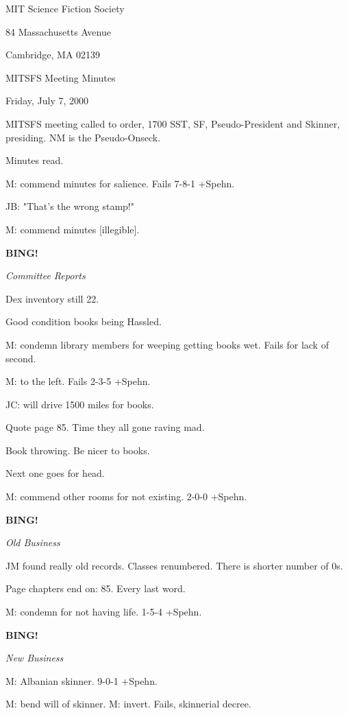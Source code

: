 \documentclass[12pt]{article}
\newcommand{\bing}{{\bf BING!} }
\newcommand{\goto}[1]{\bing \vskip 12pt \centerline{{\em{#1}}}}
\begin{document}
\begin{center}

MIT Science Fiction Society 

84 Massachusetts Avenue

Cambridge, MA 02139

\vspace{12pt}

MITSFS Meeting Minutes 

Friday, July 7, 2000

\end{center}
 
\vspace{18pt}

\setlength{\parskip}{6pt}

\noindent
MITSFS meeting called to order, 1700 SST, SF, Pseudo-President and
Skinner, presiding.  NM is the Pseudo-Onseck.

Minutes read.

M: commend minutes for salience. Fails 7-8-1 +Spehn.

JB: "That's the wrong stamp!"

M: commend minutes [illegible].

\goto{Committee Reports}

Dex inventory still 22.

Good condition books being Hassled.

M: condemn library members for weeping getting books wet. Fails for lack of second.

M: to the left. Fails 2-3-5 +Spehn.

JC: will drive 1500 miles for books.

Quote page 85. Time they all gone raving mad.

Book throwing. Be nicer to books.

Next one goes for head.

M: commend other rooms for not existing. 2-0-0 +Spehn.

\goto{Old Business}

JM found really old records. Classes renumbered. There is shorter number of 0s.

Page chapters end on: 85. Every last word.

M: condemn for not having life. 1-5-4 +Spehn.

\goto{New Business}

M: Albanian skinner. 9-0-1 +Spehn.

M: bend will of skinner. M: invert. Fails, skinnerial decree.
\end{document}
